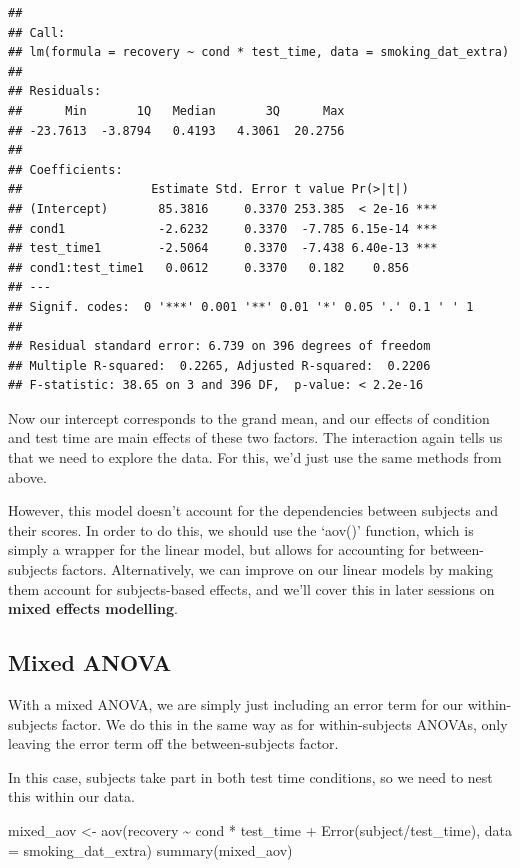 \documentclass[
]{book}
\newenvironment{Shaded}{\begin{snugshade}}{\end{snugshade}}
\newcommand{\AttributeTok}[1]{\textcolor[rgb]{0.77,0.63,0.00}{#1}}
\newcommand{\FunctionTok}[1]{\textcolor[rgb]{0.00,0.00,0.00}{#1}}
\newcommand{\NormalTok}[1]{#1}
\newcommand{\OtherTok}[1]{\textcolor[rgb]{0.56,0.35,0.01}{#1}}
\newcommand{\SpecialCharTok}[1]{\textcolor[rgb]{0.00,0.00,0.00}{#1}}
\begin{document}
\begin{verbatim}
## 
## Call:
## lm(formula = recovery ~ cond * test_time, data = smoking_dat_extra)
## 
## Residuals:
##      Min       1Q   Median       3Q      Max 
## -23.7613  -3.8794   0.4193   4.3061  20.2756 
## 
## Coefficients:
##                  Estimate Std. Error t value Pr(>|t|)    
## (Intercept)       85.3816     0.3370 253.385  < 2e-16 ***
## cond1             -2.6232     0.3370  -7.785 6.15e-14 ***
## test_time1        -2.5064     0.3370  -7.438 6.40e-13 ***
## cond1:test_time1   0.0612     0.3370   0.182    0.856    
## ---
## Signif. codes:  0 '***' 0.001 '**' 0.01 '*' 0.05 '.' 0.1 ' ' 1
## 
## Residual standard error: 6.739 on 396 degrees of freedom
## Multiple R-squared:  0.2265, Adjusted R-squared:  0.2206 
## F-statistic: 38.65 on 3 and 396 DF,  p-value: < 2.2e-16
\end{verbatim}

Now our intercept corresponds to the grand mean, and our effects of condition and test time are main effects of these two factors. The interaction again tells us that we need to explore the data. For this, we'd just use the same methods from above.

However, this model doesn't account for the dependencies between subjects and their scores. In order to do this, we should use the `aov()' function, which is simply a wrapper for the linear model, but allows for accounting for between-subjects factors. Alternatively, we can improve on our linear models by making them account for subjects-based effects, and we'll cover this in later sessions on \textbf{mixed effects modelling}.

\hypertarget{mixed-anova}{%
\subsection{Mixed ANOVA}\label{mixed-anova}}

With a mixed ANOVA, we are simply just including an error term for our within-subjects factor. We do this in the same way as for within-subjects ANOVAs, only leaving the error term off the between-subjects factor.

In this case, subjects take part in both test time conditions, so we need to nest this within our data.

\begin{Shaded}
\begin{Highlighting}[]
\NormalTok{mixed\_aov }\OtherTok{\textless{}{-}} \FunctionTok{aov}\NormalTok{(recovery }\SpecialCharTok{\textasciitilde{}}\NormalTok{ cond }\SpecialCharTok{*}\NormalTok{ test\_time }\SpecialCharTok{+} 
                   \FunctionTok{Error}\NormalTok{(subject}\SpecialCharTok{/}\NormalTok{test\_time), }
                 \AttributeTok{data =}\NormalTok{ smoking\_dat\_extra)}
\FunctionTok{summary}\NormalTok{(mixed\_aov)}
\end{Highlighting}
\end{Shaded}
\end{document}
